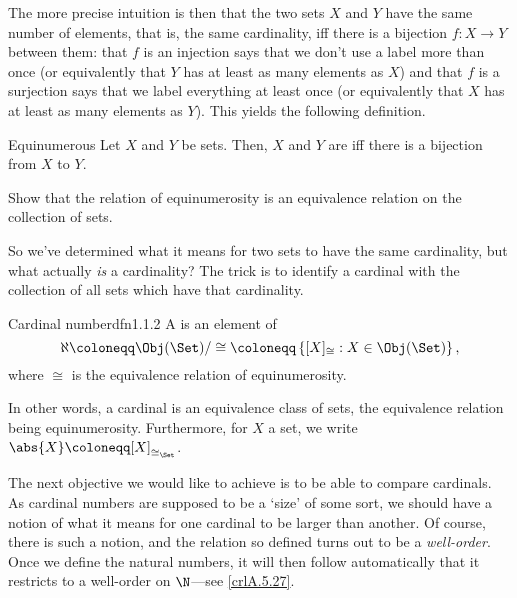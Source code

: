The more precise intuition is then that the two sets $X$ and $Y$ have the same number of elements, that is, the same cardinality, iff there is a bijection $f\colon X\rightarrow Y$ between them:  that $f$ is an injection says that we don't use a label more than once (or equivalently that $Y$ has at least as many elements as $X$) and that $f$ is a surjection says that we label everything at least once (or equivalently that $X$ has at least as many elements as $Y$).  This yields the following definition.
\begin{dfn}{Equinumerous}{}
	Let $X$ and $Y$ be sets.  Then, $X$ and $Y$ are  iff there is a bijection from $X$ to $Y$.
\end{dfn}
\begin{exr}{}{}
	Show that the relation of equinumerosity is an equivalence relation on the collection of sets.
\end{exr}

So we've determined what it means for two sets to have the same cardinality, but what actually \emph{is} a cardinality?  The trick is to identify a cardinal with the collection of all sets which have that cardinality.
\begin{dfn}{Cardinal number}{dfn1.1.2}
	A  is an element of
	\begin{equation}
	\aleph \coloneqq \Obj (\Set )/\cong \coloneqq \left\{ [X]_{\cong}:X\in \Obj (\Set )\right\} ,
	\end{equation}
	where $\cong$ is the equivalence relation of equinumerosity.
	\begin{rmk}
		In other words, a cardinal is an equivalence class of sets, the equivalence relation being equinumerosity.  Furthermore, for $X$ a set, we write $\abs{X}\coloneqq [X]_{\cong _{\Set}}$.
	\end{rmk}
\end{dfn}

The next objective we would like to achieve is to be able to compare cardinals.  As cardinal numbers are supposed to be a `size' of some sort, we should have a notion of what it means for one cardinal to be larger than another.  Of course, there is such a notion, and the relation so defined turns out to be a \emph{well-order}.  Once we define the natural numbers, it will then follow automatically that it restricts to a well-order on $\N$---see \cref{crlA.5.27}.

